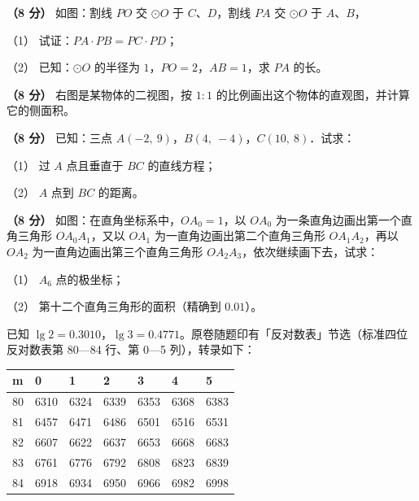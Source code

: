 \begin{question}
\textbf{（8 分）} 如图：割线 $PO$ 交 $\odot O$ 于 $C$、$D$，割线 $PA$ 交 $\odot O$ 于 $A$、$B$，
\nopagebreak[4]
\begin{center}\end{center}
\nopagebreak[4]
（1） 试证：$PA\cdot PB=PC\cdot PD$；

（2） 已知：$\odot O$ 的半径为 $1$，$PO=2$，$AB=1$，求 $PA$ 的长。

\Needspace{0.4\textheight}
\end{question}
\begin{question}
\textbf{（8 分）} 右图是某物体的二视图，按 $1:1$ 的比例画出这个物体的直观图，并计算它的侧面积。
\nopagebreak[4]
\begin{center}\end{center}
\nopagebreak[4]
\end{question}
\begin{question}
\textbf{（8 分）} 已知：三点 $A(-2,\ 9)$，$B(4,\ -4)$，$C(10,\ 8)$．试求：

（1） 过 $A$ 点且垂直于 $BC$ 的直线方程；

（2） $A$ 点到 $BC$ 的距离。

\Needspace{0.4\textheight}
\end{question}
\begin{question}
\textbf{（8 分）} 如图：在直角坐标系中，$OA_0=1$，以 $OA_0$ 为一条直角边画出第一个直角三角形 $OA_0A_1$，又以 $OA_1$ 为一直角边画出第二个直角三角形 $OA_1A_2$，再以 $OA_2$ 为一直角边画出第三个直角三角形 $OA_2A_3$，依次继续画下去，试求：
\nopagebreak[4]
\begin{center}\end{center}
\nopagebreak[4]
（1） $A_6$ 点的极坐标；

（2） 第十二个直角三角形的面积（精确到 $0.01$）。

已知 $\lg2=0.3010$，$\lg3=0.4771$。原卷随题印有「反对数表」节选（标准四位反对数表第 80—84 行、第 0—5 列），转录如下：

\begin{center}
\begin{tabular}{lllllll}
\toprule
m & 0 & 1 & 2 & 3 & 4 & 5 \\
\midrule
80 & 6310 & 6324 & 6339 & 6353 & 6368 & 6383 \\
81 & 6457 & 6471 & 6486 & 6501 & 6516 & 6531 \\
82 & 6607 & 6622 & 6637 & 6653 & 6668 & 6683 \\
83 & 6761 & 6776 & 6792 & 6808 & 6823 & 6839 \\
84 & 6918 & 6934 & 6950 & 6966 & 6982 & 6998 \\
\bottomrule
\end{tabular}
\end{center}

\end{question}